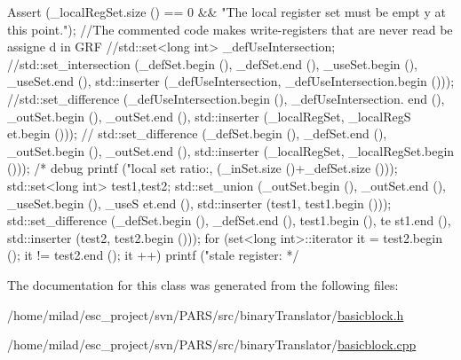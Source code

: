 \begin{DoxyCode}
                                    {
        Assert (_localRegSet.size () == 0 && "The local register set must be empt
      y at this point.");
        //The commented code makes write-registers that are never read be assigne
      d in GRF        
        //std::set<long int> _defUseIntersection;
        //std::set_intersection (_defSet.begin (), _defSet.end (), _useSet.begin 
      (), _useSet.end (), std::inserter (_defUseIntersection, _defUseIntersection.begin
       ()));
        //std::set_difference (_defUseIntersection.begin (), _defUseIntersection.
      end (), _outSet.begin (), _outSet.end (), std::inserter (_localRegSet, _localRegS
      et.begin ()));
//      std::set_difference (_defSet.begin (), _defSet.end (), _outSet.begin (), 
      _outSet.end (), std::inserter (_localRegSet, _localRegSet.begin ()));
/* debug        
        printf ("local set ratio:, %
       (_inSet.size ()+_defSet.size ()));
        std::set<long int> test1,test2;
        std::set_union (_outSet.begin (), _outSet.end (), _useSet.begin (), _useS
      et.end (), std::inserter (test1, test1.begin ()));
        std::set_difference (_defSet.begin (), _defSet.end (), test1.begin (), te
      st1.end (), std::inserter (test2, test2.begin ()));
        for  (set<long int>::iterator it = test2.begin (); it != test2.end (); it
      ++) {
                printf ("stale register: %
        }
*/
}
\end{DoxyCode}


The documentation for this class was generated from the following files:\begin{DoxyCompactItemize}
\item 
/home/milad/esc\_\-project/svn/PARS/src/binaryTranslator/\hyperlink{basicblock_8h}{basicblock.h}\item 
/home/milad/esc\_\-project/svn/PARS/src/binaryTranslator/\hyperlink{basicblock_8cpp}{basicblock.cpp}\end{DoxyCompactItemize}
